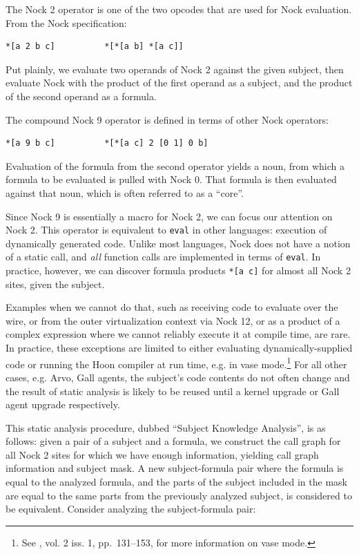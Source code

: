\documentclass[twoside]{article}
\begin{document}
The Nock 2 operator is one of the two opcodes that are used for Nock evaluation.  From the Nock specification:

\begin{lstlisting}[style=listingblock]
*[a 2 b c]          *[*[a b] *[a c]]
\end{lstlisting}

\noindent
Put plainly, we evaluate two operands of Nock 2 against the given subject, then evaluate Nock with the product of the first operand as a subject, and the product of the second operand as a formula.

The compound Nock 9 operator is defined in terms of other Nock operators:

\begin{lstlisting}[style=listingblock]
*[a 9 b c]          *[*[a c] 2 [0 1] 0 b]
\end{lstlisting}

\noindent
Evaluation of the formula from the second operator yields a noun, from which a formula to be evaluated is pulled with Nock 0.  That formula is then evaluated against that noun, which is often referred to as a ``core''.

Since Nock 9 is essentially a macro for Nock 2, we can focus our attention on Nock 2.  This operator is equivalent to \lstinline[style=inlinecode]{eval} in other languages:  execution of
dynamically generated code.  Unlike most languages, Nock does not have a notion of a static call, and \emph{all} function calls are implemented in terms of \lstinline[style=inlinecode]{eval}.  In practice, however, we can discover formula products \lstinline[style=inlinecode]{*[a c]} for almost all Nock 2 sites, given the subject.

\sloppy
Examples when we cannot do that, such as receiving code
to evaluate over the wire, or from the outer virtualization context via Nock 12, or as a product of a complex expression where we cannot reliably execute it at compile time, are rare.  In practice, these exceptions are limited to either evaluating
dynamically-supplied code or running the Hoon compiler at run time, e.g. in vase mode.\footnote{See ,  vol. 2 iss. 1, pp.~131–153, for more information on vase mode.}  For all other cases, e.g. Arvo, Gall agents, the subject's code contents do not often change and the result of static analysis is likely to be reused until a kernel upgrade or Gall agent upgrade respectively.

This static analysis procedure, dubbed ``Subject Knowledge Analysis'', is as follows:  given a pair of a subject and a formula, we construct the call graph for all Nock 2 sites for which we have enough information, yielding call graph information and subject mask.  A new subject-formula pair where the formula is equal to the analyzed formula, and the parts of the subject included in the mask are equal to the same parts from the previously analyzed subject, is considered to be equivalent.  Consider analyzing the subject-formula pair:
\end{document}

